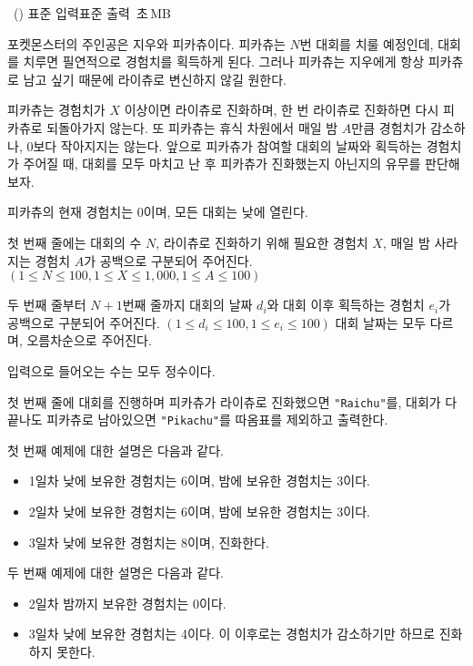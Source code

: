 \begin{problem}{\kcpcprobpika\ (\kcpcprobpikashort)}
    {표준 입력}{표준 출력}
    {\kcpcprobpikatime\,초}{\kcpcprobpikamemory\,MB}{}
    
    포켓몬스터의 주인공은 지우와 피카츄이다. 피카츄는 $N$번 대회를 치룰 예정인데, 대회를 치루면 필연적으로 경험치를 획득하게 된다. 그러나 피카츄는 지우에게 항상 피카츄로 남고 싶기 때문에 라이츄로 변신하지 않길 원한다.
    
    피카츄는 경험치가 $X$ 이상이면 라이츄로 진화하며, 한 번 라이츄로 진화하면 다시 피카츄로 되돌아가지 않는다. 또 피카츄는 휴식 차원에서 매일 밤 $A$만큼 경험치가 감소하나, 0보다 작아지지는 않는다. 앞으로 피카츄가 참여할 대회의 날짜와 획득하는 경험치가 주어질 때, 대회를 모두 마치고 난 후 피카츄가 진화했는지 아닌지의 유무를 판단해보자.
    
    피카츄의 현재 경험치는 0이며, 모든 대회는 낮에 열린다.
    
    \InputFile
    첫 번째 줄에는 대회의 수 $N$, 라이츄로 진화하기 위해 필요한 경험치 $X$, 매일 밤 사라지는 경험치 $A$가 공백으로 구분되어 주어진다. $(1 \leq N \leq 100, 1 \leq X \leq 1,000, 1 \leq A \leq 100)$
    
    두 번째 줄부터 $N + 1$번째 줄까지 대회의 날짜 $d_i$와 대회 이후 획득하는 경험치 $e_i$가 공백으로 구분되어 주어진다. $(1 \leq d_i \leq 100, 1 \leq e_i \leq 100)$ 대회 날짜는 모두 다르며, 오름차순으로 주어진다.

    입력으로 들어오는 수는 모두 정수이다. 
    
    \OutputFile
    첫 번째 줄에 대회를 진행하며 피카츄가 라이츄로 진화했으면 \texttt{"Raichu"}를, 대회가 다 끝나도 피카츄로 남아있으면 \texttt{"Pikachu"}를 따옴표를 제외하고 출력한다.
    
    \Examples
    \begin{example}
    \end{example}
    
    \Explanation
    첫 번째 예제에 대한 설명은 다음과 같다.
    \begin{itemize}
        \item 1일차 낮에 보유한 경험치는 6이며, 밤에 보유한 경험치는 3이다.
        \item 2일차 낮에 보유한 경험치는 6이며, 밤에 보유한 경험치는 3이다.
        \item 3일차 낮에 보유한 경험치는 8이며, 진화한다.
    \end{itemize}
    두 번째 예제에 대한 설명은 다음과 같다.
    \begin{itemize}
        \item 2일차 밤까지 보유한 경험치는 0이다.
        \item 3일차 낮에 보유한 경험치는 4이다. 이 이후로는 경험치가 감소하기만 하므로 진화하지 못한다.
    \end{itemize}
\end{problem}

